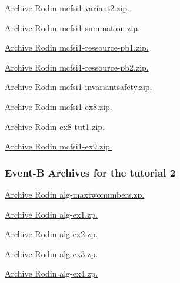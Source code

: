 \documentclass[ 12pt]{article}
\begin{document}
\href{http://mery54.github.io/teaching/mosos/models/mcfsi1-variant2.zip}{Archive 
  Rodin   mcfsi1-variant2.zip.}


\href{http://mery54.github.io/teaching/mosos/models/mcfsi1-summation.zip}{Archive 
  Rodin   mcfsi1-summation.zip.}


\href{http://mery54.github.io/teaching/mosos/models/mcfsi1-ressource-pb1.zip}{Archive 
  Rodin   mcfsi1-ressource-pb1.zip.}


\href{http://mery54.github.io/teaching/mosos/models/mcfsi1-ressource-pb1.zip}{Archive 
  Rodin   mcfsi1-ressource-pb2.zip.}





\href{http://mery54.github.io/teaching/mosos/models/mcfsi1-invariantsafety.zip}{Archive 
  Rodin   mcfsi1-invariantsafety.zip.}



\href{http://mery54.github.io/teaching/mosos/models/mcfsi1-ex8.zip}{Archive 
  Rodin   mcfsi1-ex8.zip.}

\href{http://mery54.github.io/teaching/mosos/models/mcfsi1-ex9.zip}{Archive 
  Rodin   ex8-tut1.zip.}



\href{http://mery54.github.io/teaching/mosos/models/mcfsi1-ex9.zip}{Archive 
  Rodin   mcfsi1-ex9.zip.}



 \subsubsection{Event-B Archives for   the tutorial 2}
\label{sec:event-b-archives}




\href{http://mery54.github.io/teaching/mosos/models/alg-maxtwonumbers.zip}{Archive 
  Rodin  alg-maxtwonumbers.zp.}





\href{http://mery54.github.io/teaching/mosos/models/alg-ex1.zip}{Archive 
  Rodin  alg-ex1.zp.}

\href{http://mery54.github.io/teaching/mosos/models/alg-ex2.zip}{Archive 
  Rodin  alg-ex2.zp.}

\href{http://mery54.github.io/teaching/mosos/models/alg-ex3.zip}{Archive 
  Rodin  alg-ex3.zp.}

\href{http://mery54.github.io/teaching/mosos/models/alg-ex4.zip}{Archive 
  Rodin  alg-ex4.zp.}
\end{document}
